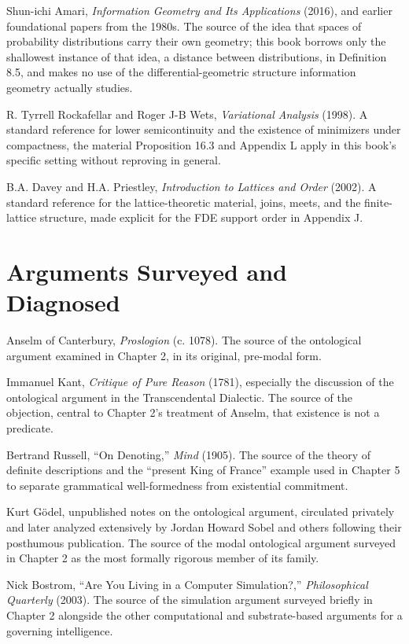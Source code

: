 \documentclass[11pt]{book}
\begin{document}
Shun-ichi Amari, \emph{Information Geometry and Its Applications} (2016), and earlier foundational papers from the 1980s. The source of the idea that spaces of probability distributions carry their own geometry; this book borrows only the shallowest instance of that idea, a distance between distributions, in Definition 8.5, and makes no use of the differential-geometric structure information geometry actually studies.

R. Tyrrell Rockafellar and Roger J-B Wets, \emph{Variational Analysis} (1998). A standard reference for lower semicontinuity and the existence of minimizers under compactness, the material Proposition 16.3 and Appendix L apply in this book's specific setting without reproving in general.

B.A. Davey and H.A. Priestley, \emph{Introduction to Lattices and Order} (2002). A standard reference for the lattice-theoretic material, joins, meets, and the finite-lattice structure, made explicit for the FDE support order in Appendix J.

\section*{Arguments Surveyed and Diagnosed}

Anselm of Canterbury, \emph{Proslogion} (c. 1078). The source of the ontological argument examined in Chapter 2, in its original, pre-modal form.

Immanuel Kant, \emph{Critique of Pure Reason} (1781), especially the discussion of the ontological argument in the Transcendental Dialectic. The source of the objection, central to Chapter 2's treatment of Anselm, that existence is not a predicate.

Bertrand Russell, ``On Denoting,'' \emph{Mind} (1905). The source of the theory of definite descriptions and the ``present King of France'' example used in Chapter 5 to separate grammatical well-formedness from existential commitment.

Kurt Gödel, unpublished notes on the ontological argument, circulated privately and later analyzed extensively by Jordan Howard Sobel and others following their posthumous publication. The source of the modal ontological argument surveyed in Chapter 2 as the most formally rigorous member of its family.

Nick Bostrom, ``Are You Living in a Computer Simulation?,'' \emph{Philosophical Quarterly} (2003). The source of the simulation argument surveyed briefly in Chapter 2 alongside the other computational and substrate-based arguments for a governing intelligence.
\end{document}
